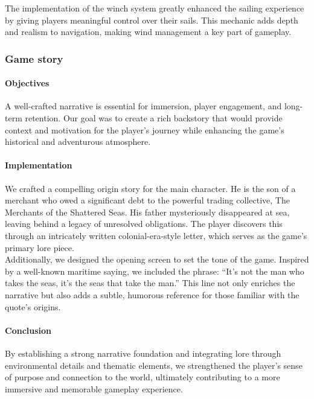 \documentclass{article}
\begin{document}
The implementation of the winch system greatly enhanced the sailing experience by giving players meaningful control over their sails. This mechanic adds depth and realism to navigation, making wind management a key part of gameplay.


\subsubsection{Game story}
\paragraph{Objectives}\hfill

A well-crafted narrative is essential for immersion, player engagement, and long-term retention. Our goal was to create a rich backstory that would provide context and motivation for the player's journey while enhancing the game's historical and adventurous atmosphere.

\paragraph{Implementation}\hfill

We crafted a compelling origin story for the main character. He is the son of a merchant who owed a significant debt to the powerful trading collective, The Merchants of the Shattered Seas. His father mysteriously disappeared at sea, leaving behind a legacy of unresolved obligations. The player discovers this through an intricately written colonial-era-style letter, which serves as the game's primary lore piece.\\

Additionally, we designed the opening screen to set the tone of the game. Inspired by a well-known maritime saying, we included the phrase: “It's not the man who takes the seas, it's the seas that take the man.” This line not only enriches the narrative but also adds a subtle, humorous reference for those familiar with the quote's origins.

\paragraph{Conclusion}\hfill

By establishing a strong narrative foundation and integrating lore through environmental details and thematic elements, we strengthened the player's sense of purpose and connection to the world, ultimately contributing to a more immersive and memorable gameplay experience.
\end{document}
